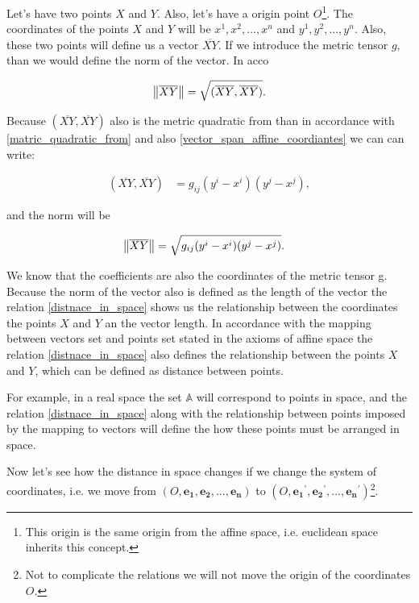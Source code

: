 \documentclass{book}
\begin{document}
Let's have two points $X$ and $Y$. Also, let's have a origin point $O$\footnote{This origin is the same origin from the affine space, i.e. euclidean space inherits this concept.}. The coordinates of the points $X$ and $Y$ will be ${x^1, x^2, ..., x^n}$ and ${y^1, y^2, ..., y^n}$. Also, these two points will define us a vector $\overline{XY}$. If we introduce the metric tensor $g$, than we would define the norm of the vector. In acco

\begin{align}
\norm{\overline{XY}} = \sqrt{(\overline{XY}, \overline{XY})}.  
\end{align}

Because $(\overline{XY}, \overline{XY})$ also is the metric quadratic from than in accordance with \eqref{matric_quadratic_from} and also \eqref{vector_span_affine_coordiantes} we can can write:

\begin{align}
(\overline{XY}, \overline{XY}) &=  g_{ij}(y^i - x^i) (y^j - x^j),
\end{align}

and the norm will be

\begin{align}
\norm{\overline{XY}} &= \sqrt{g_{ij}(y^{i} - x^{i})(y^{j} - x^{j})}. \label{distnace_in_space}
\end{align}

We know that the coefficients are also the coordinates of the metric tensor g. Because the norm of the vector also is defined as the length of the vector the relation \eqref{distnace_in_space} shows us the relationship between the coordinates the points $X$ and $Y$ an the vector length. In accordance with the mapping between vectors set and points set stated in the axioms of affine space the relation \eqref{distnace_in_space} also defines the relationship between the points $X$ and $Y$, which can be defined as distance between points.

For example, in a real space the set $\mathbb{A}$ will correspond to points in space, and the relation \eqref{distnace_in_space} along with the relationship between points imposed by the mapping to vectors will define the how these points must be arranged in space.

Now let's see how the distance in space changes if we change the system of coordinates, i.e. we move from $(O, \boldsymbol{e_1}, \boldsymbol{e_2}, ..., \boldsymbol{e_n})$ to $(O, \boldsymbol{e_1}^{'}, \boldsymbol{e_2}^{'}, ..., \boldsymbol{e_n}^{'})$\footnote{Not to complicate the relations we will not move the origin of the coordinates $O$.}.
\end{document}
